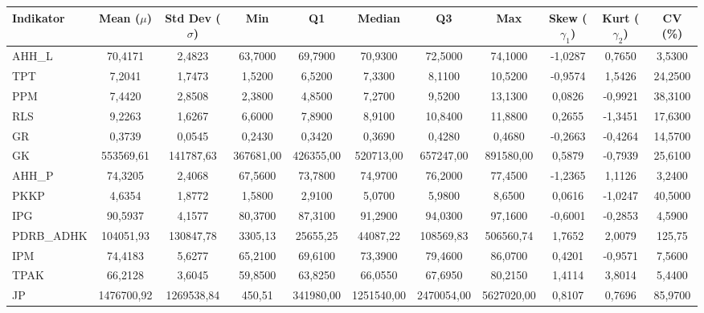 \begin{adjustbox}{max width=\textwidth}
\small
\begin{tabular}{|>{\centering\arraybackslash}p{2.5cm}|c|c|c|c|c|c|c|c|c|c|}
\hline
\textbf{Indikator} & \textbf{Mean ($\mu$)} & \textbf{Std Dev ($\sigma$)} & \textbf{Min} & \textbf{Q1} & \textbf{Median} & \textbf{Q3} & \textbf{Max} & \textbf{Skew ($\gamma_1$)} & \textbf{Kurt ($\gamma_2$)} & \textbf{CV (\%)} \\
\hline
AHH\_L & 70,4171 & 2,4823 & 63,7000 & 69,7900 & 70,9300 & 72,5000 & 74,1000 & -1,0287 & 0,7650 & 3,5300 \\
TPT & 7,2041 & 1,7473 & 1,5200 & 6,5200 & 7,3300 & 8,1100 & 10,5200 & -0,9574 & 1,5426 & 24,2500 \\
PPM & 7,4420 & 2,8508 & 2,3800 & 4,8500 & 7,2700 & 9,5200 & 13,1300 & 0,0826 & -0,9921 & 38,3100 \\
RLS & 9,2263 & 1,6267 & 6,6000 & 7,8900 & 8,9100 & 10,8400 & 11,8800 & 0,2655 & -1,3451 & 17,6300 \\
GR & 0,3739 & 0,0545 & 0,2430 & 0,3420 & 0,3690 & 0,4280 & 0,4680 & -0,2663 & -0,4264 & 14,5700 \\
GK & 553569,61 & 141787,63 & 367681,00 & 426355,00 & 520713,00 & 657247,00 & 891580,00 & 0,5879 & -0,7939 & 25,6100 \\
AHH\_P & 74,3205 & 2,4068 & 67,5600 & 73,7800 & 74,9700 & 76,2000 & 77,4500 & -1,2365 & 1,1126 & 3,2400 \\
PKKP & 4,6354 & 1,8772 & 1,5800 & 2,9100 & 5,0700 & 5,9800 & 8,6500 & 0,0616 & -1,0247 & 40,5000 \\
IPG & 90,5937 & 4,1577 & 80,3700 & 87,3100 & 91,2900 & 94,0300 & 97,1600 & -0,6001 & -0,2853 & 4,5900 \\
PDRB\_ADHK & 104051,93 & 130847,78 & 3305,13 & 25655,25 & 44087,22 & 108569,83 & 506560,74 & 1,7652 & 2,0079 & 125,75 \\
IPM & 74,4183 & 5,6277 & 65,2100 & 69,6100 & 73,3900 & 79,4600 & 86,0700 & 0,4201 & -0,9571 & 7,5600 \\
TPAK & 66,2128 & 3,6045 & 59,8500 & 63,8250 & 66,0550 & 67,6950 & 80,2150 & 1,4114 & 3,8014 & 5,4400 \\
JP & 1476700,92 & 1269538,84 & 450,51 & 341980,00 & 1251540,00 & 2470054,00 & 5627020,00 & 0,8107 & 0,7696 & 85,9700 \\
\hline
\end{tabular}
\end{adjustbox}
